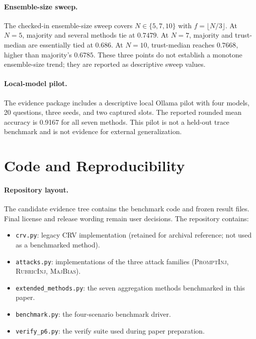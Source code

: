 \documentclass[11pt]{article}
\begin{document}
\paragraph{Ensemble-size sweep.}
The checked-in ensemble-size sweep covers $N\in\{5,7,10\}$ with
$f=\lfloor N/3\rfloor$. At $N=5$, majority and several methods tie at
$0.7479$. At $N=7$, majority and trust-median are essentially tied at
$0.686$. At $N=10$, trust-median reaches $0.7668$, higher than majority's
$0.6785$. These three points do not establish a monotone ensemble-size
trend; they are reported as descriptive sweep values.

\paragraph{Local-model pilot.}
The evidence package includes a descriptive local Ollama pilot with four
models, 20 questions, three seeds, and two captured slots. The reported
rounded mean accuracy is 0.9167 for all seven methods. This pilot is not a
held-out trace benchmark and is not evidence for external generalization.

\section{Code and Reproducibility}
\label{app:code}

\paragraph{Repository layout.}
The candidate evidence tree contains the benchmark code and frozen result
files. Final license and release wording remain user decisions. The
repository contains:
\begin{itemize}
  \item \texttt{crv.py}: legacy CRV implementation (retained for
        archival reference; not used as a benchmarked method).
  \item \texttt{attacks.py}: implementations of the three attack
        families (\textsc{PromptInj}, \textsc{RubricInj},
        \textsc{MajBias}).
  \item \texttt{extended\_methods.py}: the seven aggregation methods
        benchmarked in this paper.
  \item \texttt{benchmark.py}: the four-scenario benchmark driver.
  \item \texttt{verify\_p6.py}: the verify suite used during
        paper preparation.
\end{itemize}
\end{document}
